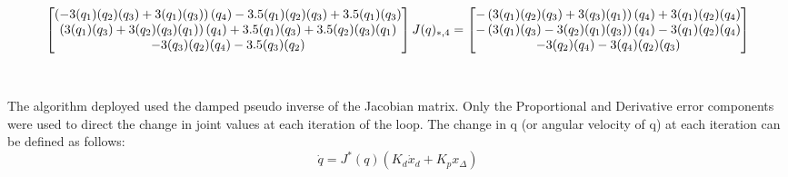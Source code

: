 \documentclass{report}
\let\cos\relax
\let\sin\relax
\newcommand{\sin}[1]{\mathit{S}_{#1}}
\newcommand{\cos}[1]{\mathit{C}_{#1}}
\begin{document}
\begin{equation*}
\begin{bmatrix}
 \left(- 3 \sin{\left(q_{1} \right)} \sin{\left(q_{2} \right)} \sin{\left(q_{3} \right)} + 3 \cos{\left(q_{1} \right)} \cos{\left(q_{3} \right)}\right) \cos{\left(q_{4} \right)} - 3.5 \sin{\left(q_{1} \right)} \sin{\left(q_{2} \right)} \sin{\left(q_{3} \right)} + 3.5 \cos{\left(q_{1} \right)} \cos{\left(q_{3} \right)}
 \\
 \left(3 \sin{\left(q_{1} \right)} \cos{\left(q_{3} \right)} + 3 \sin{\left(q_{2} \right)} \sin{\left(q_{3} \right)} \cos{\left(q_{1} \right)}\right) \cos{\left(q_{4} \right)} + 3.5 \sin{\left(q_{1} \right)} \cos{\left(q_{3} \right)} + 3.5 \sin{\left(q_{2} \right)} \sin{\left(q_{3} \right)} \cos{\left(q_{1} \right)}
 \\
 - 3 \sin{\left(q_{3} \right)} \cos{\left(q_{2} \right)} \cos{\left(q_{4} \right)} - 3.5 \sin{\left(q_{3} \right)} \cos{\left(q_{2} \right)}
 
 
\end{bmatrix}\\ \\

J(q)_{*,4} = 
\begin{bmatrix}
- \left(3 \sin{\left(q_{1} \right)} \sin{\left(q_{2} \right)} \cos{\left(q_{3} \right)} + 3 \sin{\left(q_{3} \right)} \cos{\left(q_{1} \right)}\right) \sin{\left(q_{4} \right)} + 3 \sin{\left(q_{1} \right)} \cos{\left(q_{2} \right)} \cos{\left(q_{4} \right)}
\\
- \left(3 \sin{\left(q_{1} \right)} \sin{\left(q_{3} \right)} - 3 \sin{\left(q_{2} \right)} \cos{\left(q_{1} \right)} \cos{\left(q_{3} \right)}\right) \sin{\left(q_{4} \right)} - 3 \cos{\left(q_{1} \right)} \cos{\left(q_{2} \right)} \cos{\left(q_{4} \right)}
\\
- 3 \sin{\left(q_{2} \right)} \cos{\left(q_{4} \right)} - 3 \sin{\left(q_{4} \right)} \cos{\left(q_{2} \right)} \cos{\left(q_{3} \right)}
\end{bmatrix}
\end{equation*} \\ \\

\noindent The algorithm deployed used the damped pseudo inverse of the Jacobian matrix. Only the Proportional and Derivative error components were used to direct the change in joint values at each iteration of the loop. 
The change in q (or angular velocity of q) at each iteration can be defined as follows: \\


\begin{equation*}
    \dot{q} = J^{\text{*}}(q) (K_{d} \dot{x}_{d} + K_{p}x_{\Delta} )
\end{equation*}
\end{document}
